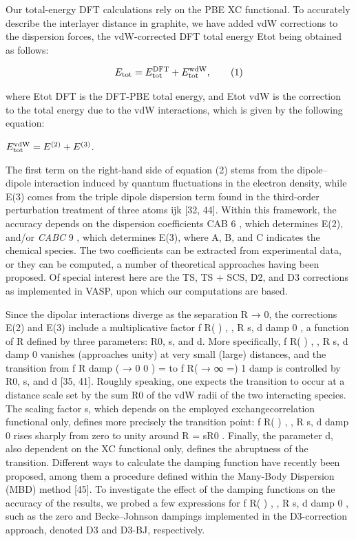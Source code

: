 \documentclass{article}
\begin{document}
Our total-energy DFT calculations rely on the PBE XC functional. To accurately describe the interlayer distance in graphite, we have added vdW corrections to the dispersion forces, the vdW-corrected DFT total energy Etot being obtained as follows:

$$E_{\rm tot}=E_{\rm tot}^{\rm DFT}+E_{\rm tot}^{\rm wdW},\tag{1}$$

where Etot DFT is the DFT-PBE total energy, and Etot vdW is the correction to the total energy due to the vdW interactions, which is given by the following equation:

$E_{\rm tot}^{\rm vdW}=E^{(2)}+E^{(3)}$.

The first term on the right-hand side of equation (2) stems from the dipole–dipole interaction induced by quantum fluctuations in the electron density, while E(3) comes from the triple dipole dispersion term found in the third-order perturbation treatment of three atoms ijk [32, 44]. Within this framework, the accuracy depends on the dispersion coefficients CAB 6 , which determines E(2), and/or \textit{CABC} 9 , which determines E(3), where A, B, and C indicates the chemical species. The two coefficients can be extracted from experimental data, or they can be computed, a number of theoretical approaches having been proposed. Of special interest here are the TS, TS + SCS, D2, and D3 corrections as implemented in VASP, upon which our computations are based.

Since the dipolar interactions diverge as the separation R → 0, the corrections E(2) and E(3) include a multiplicative factor f R( ) , , R s, d damp 0 , a function of R defined by three parameters: R0, s, and d. More specifically, f R( ) , , R s, d damp 0 vanishes (approaches unity) at very small (large) distances, and the transition from f R damp ( → 0 0 ) = to f R( → ∞ =) 1 damp is controlled by R0, s, and d [35, 41]. Roughly speaking, one expects the transition to occur at a distance scale set by the sum R0 of the vdW radii of the two interacting species. The scaling factor s, which depends on the employed exchangecorrelation functional only, defines more precisely the transition point: f R( ) , , R s, d damp 0 rises sharply from zero to unity around R = sR0 . Finally, the parameter d, also dependent on the XC functional only, defines the abruptness of the transition. Different ways to calculate the damping function have recently been proposed, among them a procedure defined within the Many-Body Dispersion (MBD) method [45]. To investigate the effect of the damping functions on the accuracy of the results, we probed a few expressions for f R( ) , , R s, d damp 0 , such as the zero and Becke–Johnson dampings implemented in the D3-correction approach, denoted D3 and D3-BJ, respectively.
\end{document}
